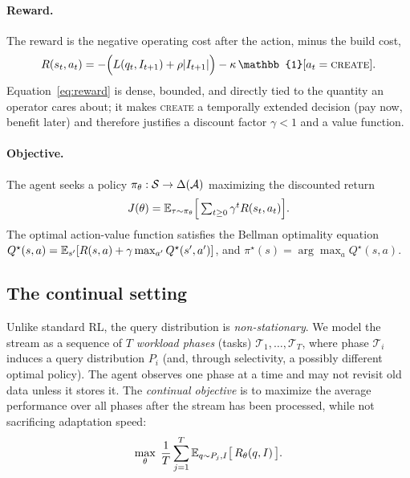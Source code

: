 \paragraph{Reward.}
The reward is the negative operating cost after the action, minus the build cost,
\begin{equation}
  R(s_t,a_t) = -\Big(L(q_t, I_{t+1}) + \rho|I_{t+1}|\Big)
              - \kappa\,\mathbb{1}[a_t=\textsc{create}].
  \label{eq:reward}
\end{equation}
Equation~\eqref{eq:reward} is dense, bounded, and directly tied to the quantity
an operator cares about; it makes \textsc{create} a temporally extended decision
(pay now, benefit later) and therefore justifies a discount factor \(\gamma<1\)
and a value function.

\paragraph{Objective.}
The agent seeks a policy \(\pi_\theta:\mathcal{S}\to\Delta(\mathcal{A})\) maximizing the
discounted return
\begin{equation}
  J(\theta) = \mathbb{E}_{\tau\sim\pi_\theta}\Big[\textstyle\sum_{t\ge0}\gamma^t R(s_t,a_t)\Big].
  \label{eq:objective}
\end{equation}
The optimal action-value function satisfies the Bellman optimality equation
\(Q^\star(s,a) = \mathbb{E}_{s'}[R(s,a) + \gamma\max_{a'} Q^\star(s',a')]\), and
\(\pi^\star(s) = \arg\max_a Q^\star(s,a)\).

\subsection{The continual setting}
Unlike standard RL, the query distribution is \emph{non-stationary}. We model the
stream as a sequence of \(T\) \emph{workload phases} (tasks)
\(\mathcal{T}_1,\dots,\mathcal{T}_T\), where phase \(\mathcal{T}_i\) induces a
query distribution \(P_i\) (and, through selectivity, a possibly different
optimal policy). The agent observes one phase at a time and may not revisit old
data unless it stores it. The \emph{continual objective} is to maximize the
average performance over all phases after the stream has been processed, while
not sacrificing adaptation speed:
\begin{equation}
  \max_\theta \; \frac{1}{T}\sum_{j=1}^{T} \mathbb{E}_{q\sim P_j, I}\big[\,R_\theta(q,I)\,\big].
\end{equation}

